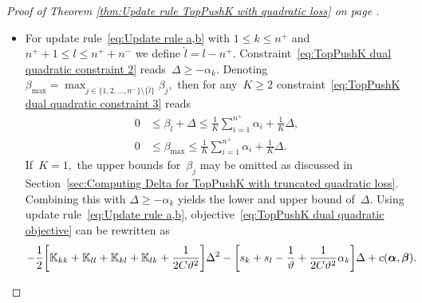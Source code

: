 \begin{proof}[Proof of Theorem \ref{thm:Update rule TopPushK with quadratic loss} on page \pageref{thm:Update rule TopPushK with quadratic loss}]
\begin{itemize}
    \item For update rule~\eqref{eq:Update rule a,b} with $1 \le k \le n^+$ and $n^+ + 1 \le l \le n^+ + n^-$ we define $\hat{l} = l - n^+.$ Constraint~\eqref{eq:TopPushK dual quadratic constraint 2} reads~$\Delta \geq - \alpha_k.$ Denoting~$\beta_{\max} = \max_{j \in \{1, 2, \ldots, n^- \} \setminus \{\hat l\}} \beta_j,$ then for any~$K \geq 2$ constraint~\eqref{eq:TopPushK dual quadratic constraint 3} reads
    \begin{equation}\label{eq: TopPushK dual quadratic a,b - bounds}
      \begin{aligned}
        0 & \leq \beta_{\hat{l}} + \Delta \leq \frac{1}{K} \sum_{i = 1}^{n^+} \alpha_i + \frac{1}{K} \Delta, \\
        0 & \leq \beta_{\max} \leq \frac{1}{K} \sum_{i = 1}^{n^+} \alpha_i + \frac{1}{K} \Delta.
      \end{aligned}
    \end{equation}
    If~$K = 1,$ the upper bounds for~$\beta_j$ may be omitted as discussed in Section~\ref{sec:Computing Delta for TopPushK with truncated quadratic loss}. Combining this with $\Delta \geq - \alpha_k$ yields the lower and upper bound of~$\Delta.$ Using update rule~\eqref{eq:Update rule a,b}, objective~\eqref{eq:TopPushK dual quadratic objective} can be rewritten as
    \begin{equation*}
      - \frac{1}{2} \Brac[s]{\K_{kk} + \K_{ll} + \K_{kl} + \K_{lk} + \frac{1}{2C\vartheta^2}} \Delta^2 - \Brac[s]{s_k + s_l - \frac{1}{\vartheta} + \frac{1}{2C\vartheta^2} \alpha_k} \Delta + c(\bm{\alpha}, \bm{\beta}).
    \end{equation*}


\end{itemize}
\end{proof}
